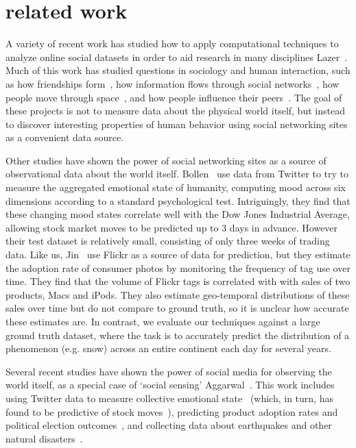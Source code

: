 \section{related work}
\label{sec:relatedwork}

A variety of recent work has studied how to apply computational
techniques to analyze online social datasets in order to aid research
in many disciplines Lazer\etal~\cite{lazer09}. Much of this work has studied
questions in sociology and human interaction, such as how friendships
form~\cite{feedback08kdd}, how information flows through social
networks~\cite{libennowell08}, how people move through
space~\cite{brockmann06}, and how people influence their
peers~\cite{anagnostpopoulos08}. The goal of these projects is not to
measure data about the physical world itself, but instead to discover
interesting properties of human behavior using social networking sites
as a convenient data source.

Other studies have shown the power of social networking sites as a
source of observational data about the world itself.  Bollen\etal~\cite{bollen11twitter} use data from Twitter to try to measure
the aggregated emotional state of humanity, computing mood across six
dimensions according to a standard psychological
test. Intriguingly, they find that these changing mood states
correlate well with the Dow Jones Industrial Average, allowing stock
market moves to be predicted up to 3 days in advance.  However their
test dataset is relatively small, consisting of only three weeks of
trading data.  Like us, Jin\etal~\cite{jin10prediction} use
Flickr as a source of data for prediction, but they estimate the
adoption rate of consumer photos by monitoring the frequency of tag
use over time. They find that the volume of Flickr tags is 
correlated  with with sales of two products, Macs and iPods. They also
estimate geo-temporal distributions of these sales over time but do
not compare to ground truth, so it is unclear how accurate these
estimates are. In contrast, we evaluate our techniques against a large
ground truth dataset, where the task is to accurately predict the
distribution of a phenomenon (e.g. snow) across an entire continent 
each day for several years.


Several recent studies have shown the power of social media  for observing
the world itself, as a special case of `social sensing' Aggarwal\etal~\cite{Aggarwal:2013vh}.
This work includes using Twitter data to measure collective emotional
state~\cite{Golder:2011cy} (which, in turn, has found to
be predictive of stock moves~\cite{bollen11twitter}),
predicting product adoption rates and political election
outcomes~\cite{jin10prediction}, and collecting data about
earthquakes and other natural disasters~\cite{Sakaki:2010uv}.

